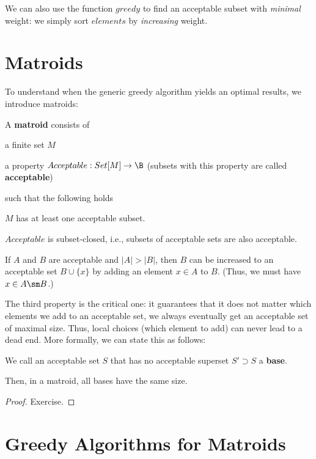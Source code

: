 We can also use the function $greedy$ to find an acceptable subset with \emph{minimal} weight: we simply sort $elements$ by \emph{increasing} weight.

\section{Matroids}

To understand when the generic greedy algorithm yields an optimal results, we introduce matroids:

\begin{definition}[Matroid]
A \textbf{matroid} consists of
\begin{compactitem}
\item a finite set $M$
\item a property $Acceptable:Set[M]\to\B$ (subsets with this property are called \textbf{acceptable}\footnotemark)
\end{compactitem}
such that the following holds
\begin{compactitem}
 \item $M$ has at least one acceptable subset.
 \item $Acceptable$ is subset-closed, i.e., subsets of acceptable sets are also acceptable.
 \item If $A$ and $B$ are acceptable and $|A|>|B|$, then $B$ can be increased to an acceptable set $B\cup\{x\}$ by adding an element $x\in A$ to $B$. (Thus, we must have $x\in A\sm B$.)
\end{compactitem}
\end{definition}

The third property is the critical one: it guarantees that it does not matter which elements we add to an acceptable set, we always eventually get an acceptable set of maximal size.
Thus, local choices (which element to add) can never lead to a dead end.
More formally, we can state this as follows:
\begin{theorem}
We call an acceptable set $S$ that has no acceptable superset $S'\supset S$ a \textbf{base}.

Then, in a matroid, all bases have the same size.
\end{theorem}
\begin{proof}
Exercise.
\end{proof}

\section{Greedy Algorithms for Matroids}

